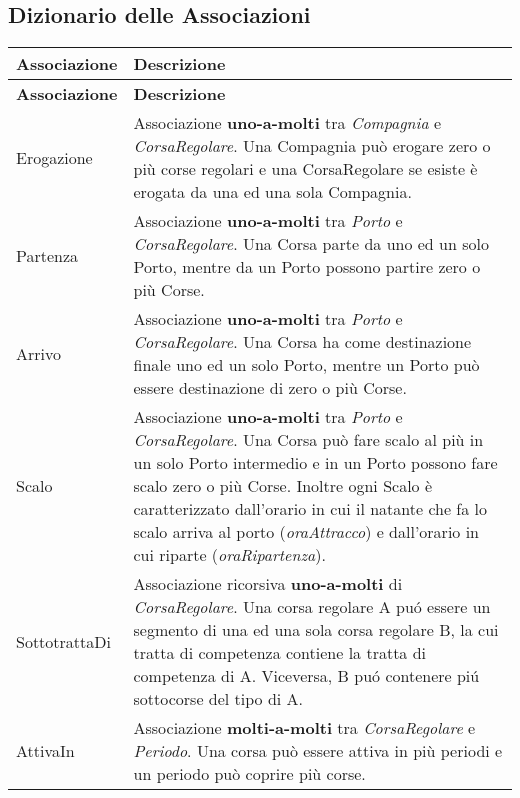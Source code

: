 \subsection{Dizionario delle Associazioni}

\begin{longtable}{|| m{} | m{} ||}
    \hline\hline
     \textbf{Associazione} & \textbf{Descrizione} \\
     \hline\hline
     \endfirsthead

     \hline
     \textbf{Associazione} & \textbf{Descrizione} \\
     \hline
     \endhead

     Erogazione & Associazione \textbf{uno-a-molti} tra \textit{Compagnia} e \textit{CorsaRegolare}. 
     Una Compagnia può erogare zero o più corse regolari e una CorsaRegolare se esiste è erogata da una ed una sola Compagnia.\\
     \hline

     Partenza & Associazione \textbf{uno-a-molti} tra \textit{Porto} e \textit{CorsaRegolare}. 
     Una Corsa parte da uno ed un solo Porto, mentre da un Porto possono partire zero o più Corse.\\
     \hline

     Arrivo & Associazione \textbf{uno-a-molti} tra \textit{Porto} e \textit{CorsaRegolare}. 
     Una Corsa ha come destinazione finale uno ed un solo Porto, mentre un Porto può essere destinazione di zero o più Corse.\\
     \hline

     Scalo & Associazione \textbf{uno-a-molti} tra \textit{Porto} e \textit{CorsaRegolare}. 
     Una Corsa può fare scalo al più in un solo Porto intermedio e in un Porto possono fare scalo zero o più Corse. 
     Inoltre ogni Scalo è caratterizzato dall'orario in cui il natante che fa lo scalo arriva al porto (\textit{oraAttracco}) e dall'orario in cui riparte (\textit{oraRipartenza}).\\
     \hline

     SottotrattaDi & Associazione ricorsiva \textbf{uno-a-molti} di \textit{CorsaRegolare}. 
     Una corsa regolare A puó essere un segmento di una ed una sola corsa regolare B, la cui tratta di competenza contiene la tratta di competenza di A. Viceversa, B puó contenere piú sottocorse del tipo di A.\\
     \hline

     AttivaIn & Associazione \textbf{molti-a-molti} tra \textit{CorsaRegolare} e \textit{Periodo}. 
     Una corsa può essere attiva in più periodi e un periodo può coprire più corse.\\
     \hline


\end{longtable}
